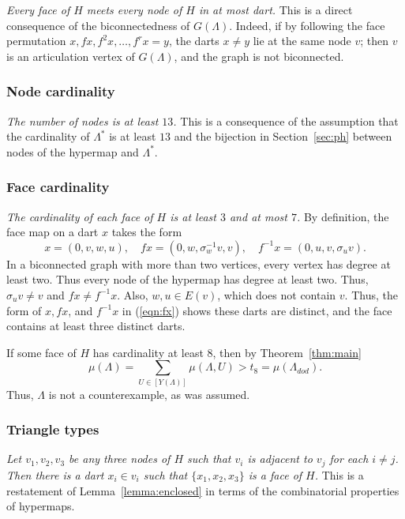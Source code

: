 \documentclass{article} %
\begin{document}
{\it Every face of $H$ meets every node of $H$ in at most
dart.}  This is a direct consequence of the biconnectedness of $G(\Lambda)$.
Indeed, if by following the face permutation $x,f x, f^2 x,\ldots, f^r x= y$,
the darts $x\ne y$ lie at the same node $v$; then $v$ is an articulation vertex
of $G(\Lambda)$, and the graph is not biconnected.

\subsubsection{Node cardinality}

{\it The number of nodes is at least $13$.}  This is a consequence of the assumption
that the cardinality of $\Lambda^*$ is at least $13$ and the bijection in
Section~\ref{sec:ph} between nodes of the hypermap and $\Lambda^*$.

\subsubsection{Face cardinality}\label{sec:face}

{\it The cardinality of each face of $H$ is at least $3$ and at most $7$.}
By  definition, the face map on a dart $x$ takes the form
\begin{equation}\label{eqn:fx}
x = (0,v,w,u),\quad
f x = (0,w,\sigma_w^{-1}v,v),\quad
f^{-1} x = (0,u,v,\sigma_u v).
\end{equation}
In a biconnected graph with more than two vertices,
every vertex has degree at least two.
Thus every node of the hypermap has degree
at least two.  Thus, $\sigma_u v\ne v$ and $f x\ne f^{-1} x$.
Also, $w,u\in E(v)$, which does not contain $v$.  Thus, 
the form of $x,fx$, and 
$f^{-1} x$
in (\ref{eqn:fx}) shows these darts are distinct, and
the
face contains at least three distinct darts.

If some face of $H$ has cardinality at least $8$, then by Theorem~\ref{thm:main}
$$
\mu(\Lambda) =\sum_{U\in [Y(\Lambda)]}\mu(\Lambda,U) > t_8 =\mu(\Lambda_{dod}).
$$
Thus, $\Lambda$ is not a counterexample, as was assumed.

\subsubsection{Triangle types}

{\it Let $v_1,v_2,v_3$ be any three nodes of $H$ such that $v_i$ is
adjacent to $v_j$ for each $i\ne j$. Then there is a dart $x_i\in v_i$
such that $\{x_1,x_2,x_3\}$ is a face of $H$.}
This is a restatement of Lemma~\ref{lemma:enclosed} in terms of the
combinatorial properties of hypermaps.
\end{document}
